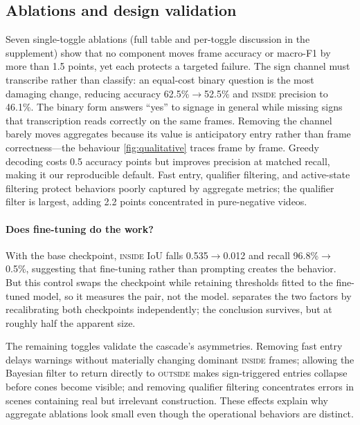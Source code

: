 \documentclass[10pt,twocolumn,letterpaper]{article}
\begin{document}
\subsection{Ablations and design validation}
\label{sec:ablations}

Seven single-toggle ablations (full table and per-toggle discussion in the supplement) show that no component moves frame accuracy or macro-F1 by more than 1.5 points, yet each protects a targeted failure.  The sign channel must transcribe rather than classify: an equal-cost binary question is the most damaging change, reducing accuracy 62.5\%$\to$52.5\% and \textsc{inside} precision to 46.1\%.  The binary form answers ``yes'' to signage in general while missing signs that transcription reads correctly on the same frames.  Removing the channel barely moves aggregates because its value is anticipatory entry rather than frame correctness---the behaviour \cref{fig:qualitative} traces frame by frame.  Greedy decoding costs 0.5 accuracy points but improves precision at matched recall, making it our reproducible default.  Fast entry, qualifier filtering, and active-state filtering protect behaviors poorly captured by aggregate metrics; the qualifier filter is largest, adding 2.2 points concentrated in pure-negative videos.

\paragraph{Does fine-tuning do the work?}  With the base checkpoint, \textsc{inside} IoU falls 0.535$\to$0.012 and recall 96.8\%$\to$0.5\%, suggesting that fine-tuning rather than prompting creates the behavior.  But this control swaps the checkpoint while retaining thresholds fitted to the fine-tuned model, so it measures the pair, not the model.   separates the two factors by recalibrating both checkpoints independently; the conclusion survives, but at roughly half the apparent size.

The remaining toggles validate the cascade's asymmetries.  Removing fast entry delays warnings without materially changing dominant \textsc{inside} frames; allowing the Bayesian filter to return directly to \textsc{outside} makes sign-triggered entries collapse before cones become visible; and removing qualifier filtering concentrates errors in scenes containing real but irrelevant construction.  These effects explain why aggregate ablations look small even though the operational behaviors are distinct.
\end{document}
